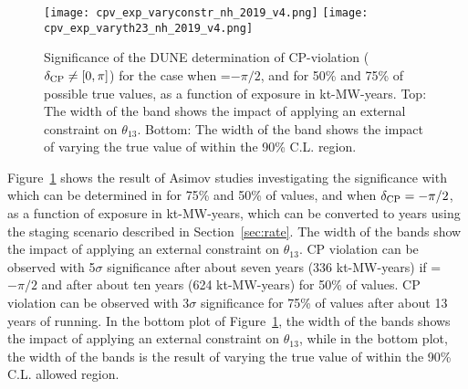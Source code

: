 \begin{figure}[htbp]
  \centering
  \texttt{[image: cpv\_exp\_varyconstr\_nh\_2019\_v4.png]}
  \texttt{[image: cpv\_exp\_varyth23\_nh\_2019\_v4.png]}
  \caption[Significance of the DUNE determination of CP-violation as a function of exposure]{Significance of the DUNE determination of CP-violation ($\delta_{\rm CP} \neq [0,\pi]$) for the case when \deltacp=$-\pi/2$, and for 50\% and 75\% of possible true \deltacp values, as a function of exposure in kt-MW-years. Top: The width of the band shows the impact of applying an external constraint on $\theta_{13}$. Bottom: The width of the band shows the impact of varying the true value of  within the  90\% C.L. region.}
  \label{fig:cpv_exposure}
\end{figure}
Figure~\ref{fig:cpv_exposure} shows the result of Asimov studies investigating the significance
with which  can be determined in  for 75\% and 50\% of \deltacp values, and when $\delta_{\rm CP}=-\pi/2$, as a function of exposure in kt-MW-years, which can be converted to years using the staging scenario described in Section~\ref{sec:rate}. The width of the bands show the impact of applying an external constraint on $\theta_{13}$. CP violation can be observed with 5$\sigma$ significance after about seven years (336 kt-MW-years) if \deltacp = $-\pi/2$ and after about ten years (624 kt-MW-years) for 50\% of \deltacp values. CP violation can be observed with 3$\sigma$ significance for 75\% of \deltacp values after about 13 years of running. In the bottom plot of Figure~\ref{fig:cpv_exposure}, the width of the bands shows the impact of applying an external constraint on $\theta_{13}$, while in the bottom plot, the width of the bands is the result of varying the true value of  within the  90\% C.L. allowed region.


